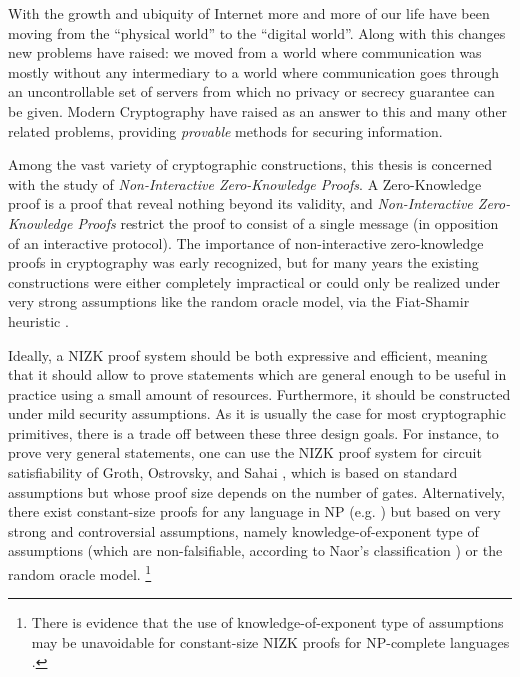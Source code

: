 With the growth and ubiquity of Internet more and more of our life have been moving from the ``physical world'' to the ``digital world''. Along with this changes new problems have raised: we moved from a world where communication was mostly without any intermediary to a world where communication goes through an uncontrollable set of servers from which no privacy or secrecy guarantee can be given. Modern Cryptography have raised as an answer to this and many other related problems, providing \emph{provable} methods for securing information.  

Among the vast variety of cryptographic constructions, this thesis is concerned with the study of \emph{Non-Interactive Zero-Knowledge Proofs}.
A Zero-Knowledge proof is a proof that reveal nothing beyond its validity, and \emph{Non-Interactive Zero-Knowledge Proofs} restrict the proof to consist of a single message (in opposition of an interactive protocol).
The importance of non-interactive zero-knowledge proofs in cryptography was early recognized, but for many years the existing constructions were either completely impractical or could only be realized under very strong assumptions like the random oracle model, via the Fiat-Shamir heuristic \cite{C:FiaSha86}. 

Ideally, a NIZK proof system should be both expressive and efficient, meaning that it should allow to prove
statements which are general enough to be useful in practice using a small amount of resources.
Furthermore, it should be constructed under
mild security assumptions.
As it is usually the case for most cryptographic primitives, there is a trade off between these three design goals.
For instance,
to prove very general statements, one can use the NIZK proof 
system for circuit satisfiability of Groth, Ostrovsky, and Sahai 
\cite{EC:GroOstSah06}, which is based on standard assumptions but 
whose proof size depends on the number of gates. 
Alternatively,
there exist constant-size proofs for any language in NP
  (e.g. \cite{EC:GGPR13}) but based on very strong and controversial assumptions, 
  namely knowledge-of-exponent type of assumptions 
  (which are non-falsifiable, according to Naor's classification 
  \cite{C:Naor03}) or the random oracle model. 
\footnote{There is evidence that the use of knowledge-of-exponent type of  assumptions 
may be unavoidable for constant-size NIZK proofs for NP-complete languages \cite{STOC:GenWic11}.}

